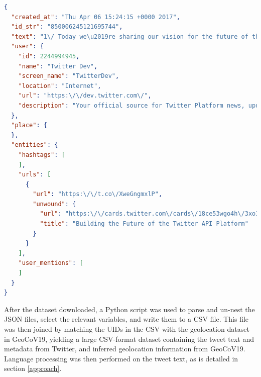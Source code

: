 \documentclass{article}
\begin{document}
\begin{singlespace}
\begin{lstlisting}[language=json,numbers=none,caption=Example Tweet object JSON file \parencite{twitterinc.DataDictionaryStandard2021}]
{
  "created_at": "Thu Apr 06 15:24:15 +0000 2017",
  "id_str": "850006245121695744",
  "text": "1\/ Today we\u2019re sharing our vision for the future of the Twitter API platform!\nhttps:\/\/t.co\/XweGngmxlP",
  "user": {
    "id": 2244994945,
    "name": "Twitter Dev",
    "screen_name": "TwitterDev",
    "location": "Internet",
    "url": "https:\/\/dev.twitter.com\/",
    "description": "Your official source for Twitter Platform news, updates & events. Need technical help? Visit https:\/\/twittercommunity.com\/ \u2328\ufe0f #TapIntoTwitter"
  },
  "place": {   
  },
  "entities": {
    "hashtags": [      
    ],
    "urls": [
      {
        "url": "https:\/\/t.co\/XweGngmxlP",
        "unwound": {
          "url": "https:\/\/cards.twitter.com\/cards\/18ce53wgo4h\/3xo1c",
          "title": "Building the Future of the Twitter API Platform"
        }
      }
    ],
    "user_mentions": [     
    ]
  }
}
\end{lstlisting}
\end{singlespace}
After the dataset downloaded, a Python script was used to parse and un-nest the JSON files, select the relevant variables, and write them to a CSV file. This file was then joined by matching the UIDs in the CSV with the geolocation dataset in GeoCoV19, yielding a large CSV-format dataset containing the tweet text and metadata from Twitter, and inferred geolocation information from GeoCoV19. Language processing was then performed on the tweet text, as is detailed in section \ref{approach}.
\end{document}
